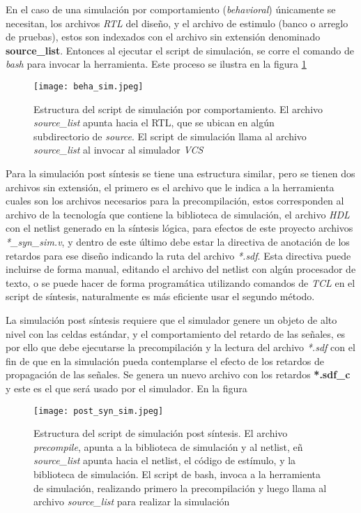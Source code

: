 En el caso de una simulación por comportamiento (\textit{behavioral}) únicamente se necesitan, los archivos \textit{RTL} del diseño, y el archivo de estimulo (banco o arreglo de pruebas), estos son indexados con el archivo sin extensión denominado \textbf{source\_list}. Entonces al ejecutar el script de simulación, se corre el comando de \textit{bash} para invocar la herramienta. Este proceso se ilustra en la figura \ref{beha_sim}

\begin{figure}[h]
\texttt{[image: beha\_sim.jpeg]}
\centering
\caption{Estructura del script de simulación por comportamiento. El archivo \textit{source\_list} apunta hacia el RTL, que se ubican en algún subdirectorio de \textit{source}. El script de simulación llama al archivo \textit{source\_list} al invocar al simulador \textit{VCS}}
\label{beha_sim}
\end{figure}

Para la simulación post síntesis se tiene una estructura similar, pero se tienen dos archivos sin extensión, el primero es el archivo que le indica a la herramienta cuales son los archivos necesarios para la precompilación, estos corresponden al archivo de la tecnología que contiene la biblioteca de simulación, el archivo \textit{HDL} con el netlist generado en la síntesis lógica, para efectos de este proyecto archivos \textit{*\_syn\_sim.v}, y dentro de este último debe estar la directiva de anotación de los retardos para ese diseño indicando la ruta del archivo \textit{*.sdf}. Esta directiva puede incluirse de forma manual, editando el archivo del netlist con algún procesador de texto, o se puede hacer de forma programática utilizando comandos de \textit{TCL} en el script de síntesis, naturalmente es más eficiente usar el segundo método.

La simulación post síntesis requiere que el simulador genere un objeto de alto nivel con las celdas estándar, y el comportamiento del retardo de las señales, es por ello que debe ejecutarse la precompilación y la lectura del archivo \textit{*.sdf} con el fin de que en la simulación pueda contemplarse el efecto de los retardos de propagación de las señales. Se genera un nuevo archivo con los retardos \textbf{*.sdf\_c} y este es el que será usado por el simulador. En la figura

\begin{figure}[h]
\texttt{[image: post\_syn\_sim.jpeg]}
\centering
\caption{Estructura del script de simulación post síntesis. El archivo \textit{precompile}, apunta a la biblioteca de simulación y al netlist, eñ \textit{source\_list} apunta hacia el netlist, el código de estímulo, y la biblioteca de simulación. El script de bash, invoca a la herramienta de simulación, realizando primero la precompilación y luego llama al archivo \textit{source\_list} para realizar la simulación}
\label{psyn_sim}
\end{figure}

